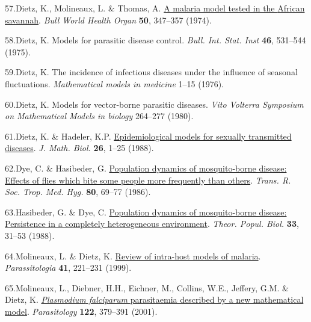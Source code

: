 \documentclass[
]{book}
\newlength{\cslhangindent}
\newlength{\cslentryspacingunit} %
\newenvironment{CSLReferences}[2] %
 {%
  \setlength{\parindent}{0pt}
  \ifodd #1
  \let\oldpar\par
  \def\par{\hangindent=\cslhangindent\oldpar}
  \fi
  \setlength{\parskip}{#2\cslentryspacingunit}
 }%
 {}
\begin{document}
\begin{CSLReferences}{0}{0}
\leavevmode{}%
57.Dietz, K., Molineaux, L. \& Thomas, A. \href{http://www.ncbi.nlm.nih.gov/entrez/query.fcgi?cmd=Retrieve\&db=PubMed\&dopt=Citation\&list_uids=4613512}{A malaria model tested in the {African} savannah}. \emph{Bull World Health Organ} \textbf{50}, 347--357 (1974).

\leavevmode{}%
58.Dietz, K. Models for parasitic disease control. \emph{Bull. Int. Stat. Inst} \textbf{46}, 531--544 (1975).

\leavevmode{}%
59.Dietz, K. The incidence of infectious diseases under the influence of seasonal fluctuations. \emph{Mathematical models in medicine} 1--15 (1976).

\leavevmode{}%
60.Dietz, K. Models for vector-borne parasitic diseases. \emph{Vito {Volterra} {Symposium} on {Mathematical} {Models} in biology} 264--277 (1980).

\leavevmode{}%
61.Dietz, K. \& Hadeler, K.P. \href{https://www.ncbi.nlm.nih.gov/pubmed/3351391}{Epidemiological models for sexually transmitted diseases}. \emph{J. Math. Biol.} \textbf{26}, 1--25 (1988).

\leavevmode{}%
62.Dye, C. \& Hasibeder, G. \href{https://doi.org/10.1016/0035-9203(86)90199-9}{Population dynamics of mosquito-borne disease: Effects of flies which bite some people more frequently than others}. \emph{Trans. R. Soc. Trop. Med. Hyg.} \textbf{80}, 69--77 (1986).

\leavevmode{}%
63.Hasibeder, G. \& Dye, C. \href{https://doi.org/10.1016/0040-5809(88)90003-2}{Population dynamics of mosquito-borne disease: Persistence in a completely heterogeneous environment}. \emph{Theor. Popul. Biol.} \textbf{33}, 31--53 (1988).

\leavevmode{}%
64.Molineaux, L. \& Dietz, K. \href{https://www.ncbi.nlm.nih.gov/pubmed/10697860}{Review of intra-host models of malaria}. \emph{Parassitologia} \textbf{41}, 221--231 (1999).

\leavevmode{}%
65.Molineaux, L., Diebner, H.H., Eichner, M., Collins, W.E., Jeffery, G.M. \& Dietz, K. \href{https://doi.org/10.1017/s0031182001007533}{\emph{{Plasmodium} falciparum} parasitaemia described by a new mathematical model}. \emph{Parasitology} \textbf{122}, 379--391 (2001).


\end{CSLReferences}
\end{document}
